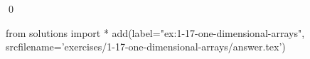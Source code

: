 
\begin{ex}
  \label{ex:1-17-one-dimensional-arrays}
  
  \qed
\end{ex}
\begin{python0}
from solutions import *
add(label="ex:1-17-one-dimensional-arrays",
    srcfilename='exercises/1-17-one-dimensional-arrays/answer.tex')
\end{python0}

